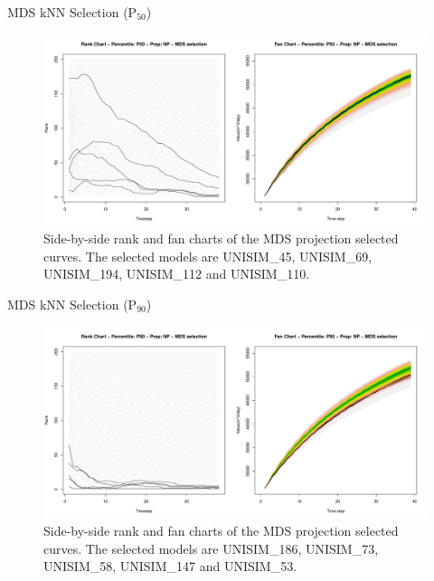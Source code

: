 \documentclass{beamer}
\begin{document}
\begin{frame}{MDS kNN Selection (P$_{50}$)}
  \begin{figure}[H]
    \centering
    \includegraphics[width=\columnwidth]{rank-fan-mds-sel-p50.pdf}
    \caption{Side-by-side rank and fan charts of the MDS projection selected curves. The selected models are UNISIM\_45, UNISIM\_69, UNISIM\_194, UNISIM\_112 and UNISIM\_110.}
    \label{fig:rank-fan-mds}
  \end{figure}
\end{frame}

\begin{frame}{MDS kNN Selection (P$_{90}$)}
  \begin{figure}[H]
    \centering
    \includegraphics[width=\columnwidth]{rank-fan-mds-sel-p90.pdf}
    \caption{Side-by-side rank and fan charts of the MDS projection selected curves. The selected models are UNISIM\_186, UNISIM\_73, UNISIM\_58, UNISIM\_147 and UNISIM\_53.}
    \label{fig:rank-fan-mds}
  \end{figure}
\end{frame}
\end{document}
